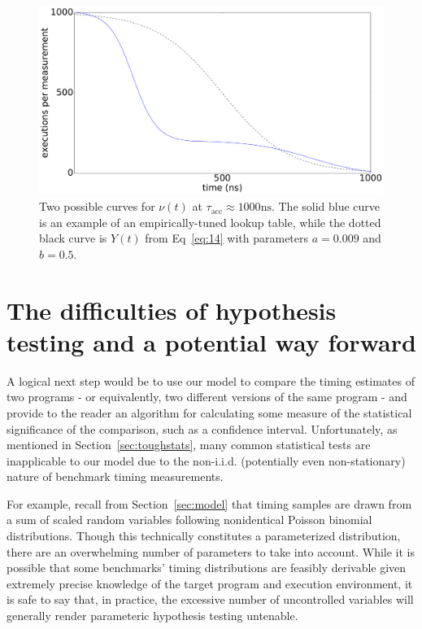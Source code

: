 \documentclass[conference]{IEEEtran}
\begin{document}
\begin{figure}
\centering
\includegraphics[width=\columnwidth]{figures/fig5/oracle}
\caption{Two possible curves for $\nu(t)$ at $\tau_{\textrm{acc}} \approx 1000 \textrm{ns}$.
The solid blue curve is an example of an empirically-tuned lookup table, while the dotted
black curve is $Y(t)$ from Eq~\ref{eq:14} with parameters $a = 0.009$ and $b = 0.5$.}
\label{fig:oracle}
\end{figure}

\label{sec:hypotesting}
\section{The difficulties of hypothesis testing and a potential way forward}

A logical next step would be to use our model to compare the timing estimates of two
programs - or equivalently, two different versions of the same program - and provide to the
reader an algorithm for calculating some measure of the statistical significance of the
comparison, such as a confidence interval. Unfortunately, as mentioned in
Section~\ref{sec:toughstats}, many common statistical tests are inapplicable to our
model due to the non-i.i.d. (potentially even non-stationary) nature of benchmark timing
measurements.

For example, recall from Section~\ref{sec:model} that timing samples are drawn from a sum of
scaled random variables following nonidentical Poisson binomial distributions. Though this
technically constitutes a parameterized distribution, there are an overwhelming number of
parameters to take into account. While it is possible that some benchmarks' timing
distributions are feasibly derivable given extremely precise knowledge of the target program
and execution environment, it is safe to say that, in practice, the excessive number of
uncontrolled variables will generally render parameteric hypothesis testing untenable.
\end{document}
